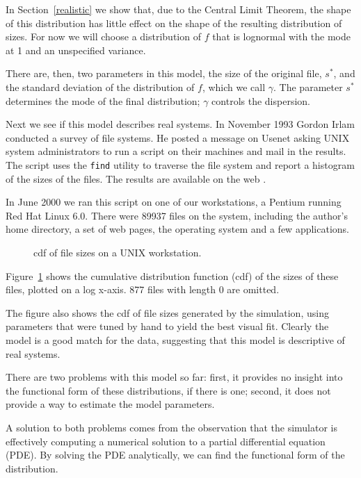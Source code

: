 \documentclass[10pt,twocolumn]{article}
\begin{document}
In Section~\ref{realistic} we show that, due to the Central Limit
Theorem, the shape of this distribution has little effect on the shape
of the resulting distribution of sizes.  For now we will choose a
distribution of $f$ that is lognormal with the mode at 1 and an
unspecified variance.

There are, then, two parameters in this model, the size of the
original file, $s^*$, and the standard deviation
of the distribution of $f$, which we call $\gamma$.
The parameter $s^*$ determines the mode
of the final distribution; $\gamma$
controls the dispersion.

Next we see if this model describes real systems.
In November 1993 Gordon Irlam conducted a survey of file systems.
He posted a message on Usenet asking UNIX system administrators
to run a script on their machines and mail in the results.  The
script uses the {\tt find} utility to traverse the file system
and report a histogram of the sizes of the files.  The results
are available on the web \cite{Irlam94}.

In June 2000 we ran this script on one of our workstations,
a Pentium running Red Hat Linux 6.0.  There were 89937 files
on the system, including the author's home directory, a set of
web pages, the operating system and a few applications.  

\begin{figure}[tb]
\centerline{}
\caption{cdf of file sizes on a UNIX workstation.}
\label{fig.rockysim}
\end{figure}

Figure~\ref{fig.rockysim} shows the
cumulative distribution function (cdf) of the sizes of these files,
plotted on a log x-axis.  877 files with length 0 are omitted.

The figure also shows the cdf of file sizes generated
by the simulation, using parameters that were tuned by hand
to yield the best visual fit.  Clearly the model is a good match
for the data, suggesting that this model is descriptive of
real systems.


\label{analytic}

There are two problems with this model so far: first, it
provides no insight into the functional form of these distributions,
if there is one; second, it does not provide a way to estimate
the model parameters.

A solution to both problems comes from the observation that the
simulator is effectively computing a numerical solution to a
partial differential equation (PDE).  By
solving the PDE analytically, we can find
the functional form of the distribution.
\end{document}
